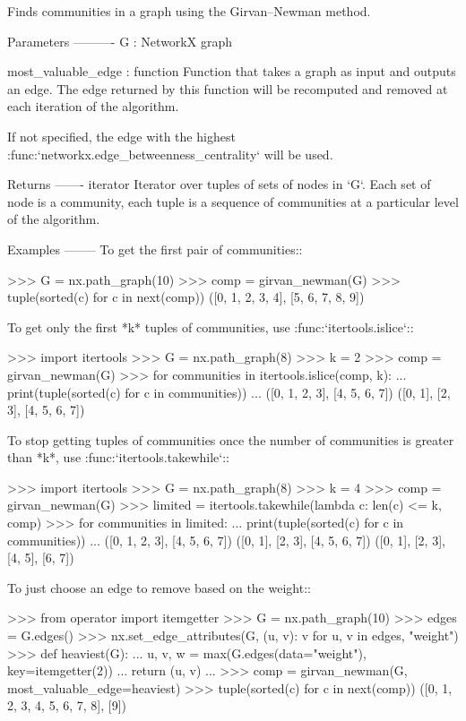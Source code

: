 \begin{DoxyVerb}Finds communities in a graph using the Girvan–Newman method.

Parameters
----------
G : NetworkX graph

most_valuable_edge : function
    Function that takes a graph as input and outputs an edge. The
    edge returned by this function will be recomputed and removed at
    each iteration of the algorithm.

    If not specified, the edge with the highest
    :func:`networkx.edge_betweenness_centrality` will be used.

Returns
-------
iterator
    Iterator over tuples of sets of nodes in `G`. Each set of node
    is a community, each tuple is a sequence of communities at a
    particular level of the algorithm.

Examples
--------
To get the first pair of communities::

    >>> G = nx.path_graph(10)
    >>> comp = girvan_newman(G)
    >>> tuple(sorted(c) for c in next(comp))
    ([0, 1, 2, 3, 4], [5, 6, 7, 8, 9])

To get only the first *k* tuples of communities, use
:func:`itertools.islice`::

    >>> import itertools
    >>> G = nx.path_graph(8)
    >>> k = 2
    >>> comp = girvan_newman(G)
    >>> for communities in itertools.islice(comp, k):
    ...     print(tuple(sorted(c) for c in communities))
    ...
    ([0, 1, 2, 3], [4, 5, 6, 7])
    ([0, 1], [2, 3], [4, 5, 6, 7])

To stop getting tuples of communities once the number of communities
is greater than *k*, use :func:`itertools.takewhile`::

    >>> import itertools
    >>> G = nx.path_graph(8)
    >>> k = 4
    >>> comp = girvan_newman(G)
    >>> limited = itertools.takewhile(lambda c: len(c) <= k, comp)
    >>> for communities in limited:
    ...     print(tuple(sorted(c) for c in communities))
    ...
    ([0, 1, 2, 3], [4, 5, 6, 7])
    ([0, 1], [2, 3], [4, 5, 6, 7])
    ([0, 1], [2, 3], [4, 5], [6, 7])

To just choose an edge to remove based on the weight::

    >>> from operator import itemgetter
    >>> G = nx.path_graph(10)
    >>> edges = G.edges()
    >>> nx.set_edge_attributes(G, {(u, v): v for u, v in edges}, "weight")
    >>> def heaviest(G):
    ...     u, v, w = max(G.edges(data="weight"), key=itemgetter(2))
    ...     return (u, v)
    ...
    >>> comp = girvan_newman(G, most_valuable_edge=heaviest)
    >>> tuple(sorted(c) for c in next(comp))
    ([0, 1, 2, 3, 4, 5, 6, 7, 8], [9])


\end{DoxyVerb}

